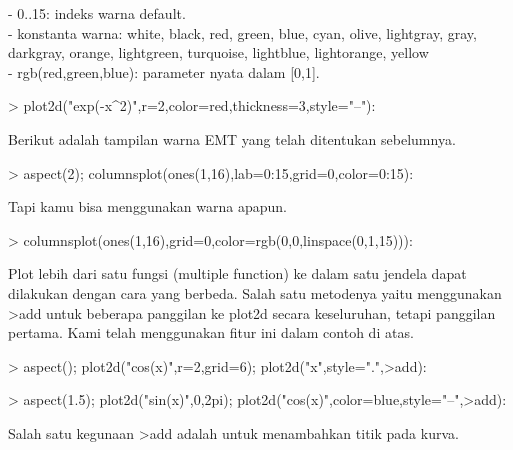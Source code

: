\documentclass{report}
\begin{document}
\begin{eulernotebook}
\begin{eulercomment}
\begin{eulercomment}
\begin{eulercomment}
\begin{eulercomment}
\begin{eulercomment}
- 0..15: indeks warna default.\\
- konstanta warna: white, black, red, green, blue, cyan, olive,
lightgray, gray, darkgray, orange, lightgreen, turquoise, lightblue,
lightorange, yellow\\
- rgb(red,green,blue): parameter nyata dalam [0,1].
\end{eulercomment}
\begin{eulerprompt}
> plot2d("exp(-x^2)",r=2,color=red,thickness=3,style="--"):
\end{eulerprompt}
\begin{eulercomment}
Berikut adalah tampilan warna EMT yang telah ditentukan sebelumnya.
\end{eulercomment}
\begin{eulerprompt}
> aspect(2); columnsplot(ones(1,16),lab=0:15,grid=0,color=0:15):
\end{eulerprompt}
\begin{eulercomment}
Tapi kamu bisa menggunakan warna apapun.
\end{eulercomment}
\begin{eulerprompt}
> columnsplot(ones(1,16),grid=0,color=rgb(0,0,linspace(0,1,15))):
\end{eulerprompt}
\begin{eulercomment}
Plot lebih dari satu fungsi (multiple function) ke dalam satu jendela
dapat dilakukan dengan cara yang berbeda. Salah satu metodenya yaitu
menggunakan \textgreater{}add untuk beberapa panggilan ke plot2d secara
keseluruhan, tetapi panggilan pertama. Kami telah menggunakan fitur
ini dalam contoh di atas.
\end{eulercomment}
\begin{eulerprompt}
> aspect(); plot2d("cos(x)",r=2,grid=6); plot2d("x",style=".",>add):
\end{eulerprompt}
\begin{eulerprompt}
> aspect(1.5); plot2d("sin(x)",0,2pi); plot2d("cos(x)",color=blue,style="--",>add):
\end{eulerprompt}
\begin{eulercomment}
Salah satu kegunaan \textgreater{}add adalah untuk menambahkan titik pada kurva.

\end{eulercomment}
\end{eulercomment}
\end{eulercomment}
\end{eulercomment}
\end{eulercomment}
\end{eulernotebook}
\end{document}
